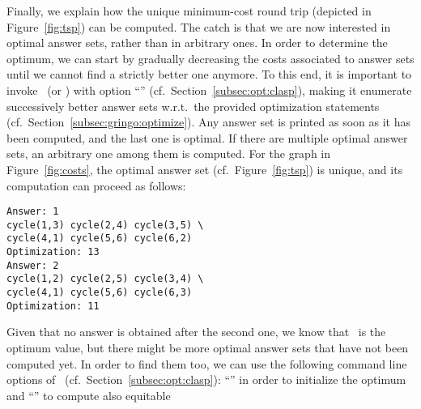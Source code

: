 Finally, we explain how the unique minimum-cost round trip
(depicted in Figure~\ref{fig:tsp}) can be computed.
The catch is that we are now interested in optimal answer sets,
rather than in arbitrary ones.
In order to determine the optimum, we can start by gradually
decreasing the costs associated to answer sets
until we cannot find a strictly better one anymore.
To this end, it is important to invoke \clasp\ (or \clingo)
with option ``'' (cf.\ Section~\ref{subsec:opt:clasp}),
making it enumerate successively better answer sets
w.r.t.\ the provided optimization statements (cf.\ Section~\ref{subsec:gringo:optimize}).
Any answer set is printed as soon as it has been computed,
and the last one is optimal.
If there are multiple optimal answer sets, an arbitrary one among them is computed.
For the graph in Figure~\ref{fig:costs},
the optimal answer set (cf.\ Figure~\ref{fig:tsp}) is unique,
and its computation can proceed as follows:%
%
\begin{lstlisting}[numbers=none]
Answer: 1
cycle(1,3) cycle(2,4) cycle(3,5) \
cycle(4,1) cycle(5,6) cycle(6,2)
Optimization: 13
Answer: 2
cycle(1,2) cycle(2,5) cycle(3,4) \
cycle(4,1) cycle(5,6) cycle(6,3)
Optimization: 11
\end{lstlisting}
%
Given that no answer is obtained after the second one,
we know that~ is the optimum value,
but there might be more optimal answer sets that have not been computed yet.
In order to find them too, we can use the following command line options
of \clasp\ (cf.\ Section~\ref{subsec:opt:clasp}):
``\code{--opt-value=11}'' in order to initialize the optimum and
``\code{--opt-all}'' to compute also equitable
